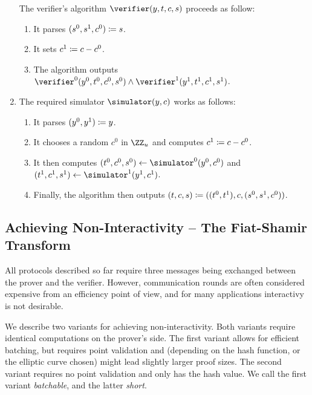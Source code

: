 \documentclass[runningheads]{llncs}
\begin{document}
\begin{enumerate}
    The verifier's algorithm $\verifier(y,t,c,s)$ proceeds as follow:
    \begin{enumerate}
      \item
        It  parses $(s^0,s^1,c^0)\coloneqq s$.
      \item
        It sets $c^1\coloneqq c-c^0$.
      \item
	The algorithm outputs $\verifier^0(y^0,t^0,c^0,s^0)\land\verifier^1(y^1,t^1,c^1,s^1)$.
    \end{enumerate}
  \item
    The required simulator $\simulator(y,c)$ works as follows:
    \begin{enumerate}
      \item
        It parses $(y^0,y^1)\coloneqq y$.
      \item
        It chooses a random $c^0$ in $\ZZ_u$ and computes $c^1\coloneqq c-c^0$.
      \item
        It then computes $(t^0,c^0,s^0)\gets\simulator^0(y^0,c^0)$ and $(t^1,c^1,s^1)\gets\simulator^1(y^1,c^1)$.
      \item
        Finally, the algorithm then outputs $(t,c,s)\coloneqq((t^0,t^1),c,(s^0,s^1,c^0))$.
    \end{enumerate}
\end{enumerate}


\subsection{Achieving Non-Interactivity -- The Fiat-Shamir Transform}
All protocols described so far require three messages being exchanged between the prover and the verifier.
However, communication rounds are often considered expensive from an efficiency point of view, and for many applications interactivy is not desirable.

We describe two variants for achieving non-interactivity. Both variants require identical computations on the prover's side.
The first variant allows for efficient batching, but requires point validation and (depending on the hash function, or the elliptic curve chosen) might lead
slightly larger proof sizes. The second variant requires no point validation and only has the hash value.
We call the first variant \emph{batchable}, and the latter \emph{short}.
\end{document}
